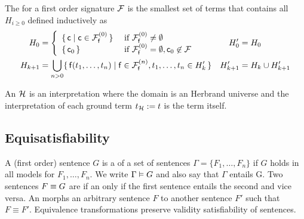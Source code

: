 \begin{definition}\label{def:hk}
	The  for a first order signature \( \mathcal{F} \)
	is the smallest set of terms that contains all \( H_{i\geq 0} \) defined inductively as
	\begin{align*}
	H_0 &=
	\left \{
	\begin{array}{ll}
	\{ \, \mc \mid \mc\in\mcFfn[0] \, \} 
	&\text{if } \mcFfn[0]\not=\emptyset
	\\
	\{ \, \mc_0 \, \}
	&\text{if } \mcFfn[0]=\emptyset, \mc_0\not\in\mcF
	\end{array}
	\right.
	&
	H'_0 &= H_0
	\\
	H_{k+1} &= \bigcup_{n> 0}
	\{ \, \mf(t_1, \ldots, t_n) \mid{} \mf\in\mcFfn[n],
	t_1, \ldots, t_n \in{} H_k' \, \}
	&
	H'_{k+1} &= H_k \cup{} H'_{k+1}
	\end{align*}

\end{definition}

\begin{definition}
	An  \( \mathcal{H} \) is an interpretation where the domain
	is an Herbrand universe
	and the interpretation of each ground term \( t_{\mathcal{H}} := t \) is the term itself.
\end{definition}





\subsection{Equisatisfiability}

\begin{definition}\label{def:entailment}\label{def:equivalence}
	A (first order) sentence \( G \) is a 
	of a set of sentences
	\( \Gamma = \{ F_1,\ldots,F_n \} \) if \( G \) holds in all models for \( F_1,\ldots,F_n \).
	We write \( \Gamma\vDash G \) and also say that \( \Gamma \) entails G.
	Two sentences \( F \equiv G \) are 
	if an only if the first sentence entails the second and vice versa.
	An  morphs an arbitrary sentence \(F\)
	to another sentence \(F'\) such that \( F\equiv F'\).
	Equivalence transformations preserve
	validity  satisfiability
	of sentences.
\end{definition}

